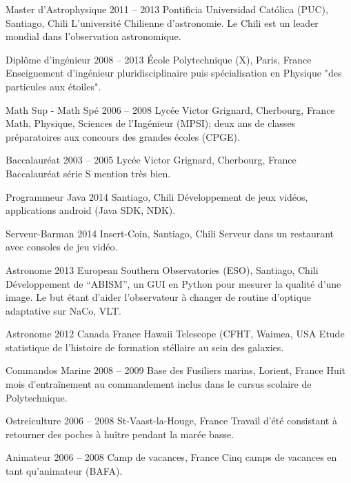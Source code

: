 

\begin{yearlist}

\item[Master d'Astrophysique]{2011 -- 2013}
	{Pontificia Universidad Cat\'olica (PUC), Santiago, Chili}
    {L'université Chilienne d'astronomie. 
    Le Chili est un leader mondial dans l'observation astronomique.}


\item[Diplôme d'ingénieur]{2008 -- 2013}
	{\'Ecole Polytechnique (X), Paris, France}
    {Enseignement d'ingénieur pluridisciplinaire puis spécialisation en Physique 
    "des particules aux étoiles".}


\item[Math Sup - Math Spé]{2006 -- 2008}
	{Lyc\'ee Victor Grignard, Cherbourg, France}
	{Math, Physique, Sciences de l'Ingénieur (MPSI);
 	deux ans de classes préparatoires aux concours des grandes écoles (CPGE).}


\item[Baccalaur\'eat]{2003 -- 2005}
	{Lyc\'ee Victor Grignard, Cherbourg, France}
	{Baccalauréat série S mention très bien.}
\end{yearlist}



\begin{joblist}
\item[Programmeur Java]{2014}
	{Santiago, Chili}
	{Développement de jeux vidéos, applications android (Java SDK, NDK).}


\item[Serveur-Barman]{2014}
	{Insert-Coin, Santiago, Chili}
	{Serveur dans un restaurant avec consoles de jeu vidéo.}


\item[Astronome]{2013}
	{European Southern Observatories (ESO), Santiago, Chili}
	{Développement de ``ABISM'', un GUI en Python pour mesurer la qualité d'une image.
 	Le but étant d'aider l'observateur à changer de routine d'optique adaptative sur NaCo, VLT.}


\item[Astronome]{2012}
	{Canada France Hawaii Telescope (CFHT, Waimea, USA}
	{Etude statistique de l'histoire de formation stéllaire au sein des galaxies.}


\item[Commandos Marine]{2008 -- 2009}
	{Base des Fusiliers marins, Lorient, France}
	{Huit mois d'entraînement au commandement inclus dans le cursus scolaire de Polytechnique.}


\item[Ostreiculture]{2006 -- 2008}
	{St-Vaast-la-Houge, France}
	{Travail d'été consistant à retourner des poches à huître pendant la marée basse.}


\item[Animateur]{2006 -- 2008}
	{Camp de vacances, France}
	{Cinq camps de vacances en tant qu'animateur (BAFA).}

\end{joblist}



